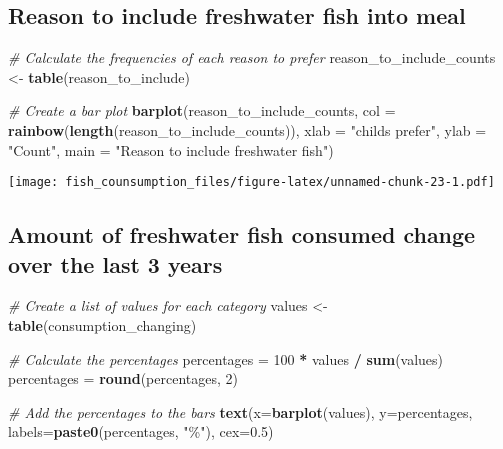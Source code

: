 \documentclass[
]{article}
\newenvironment{Shaded}{\begin{snugshade}}{\end{snugshade}}
\newcommand{\AttributeTok}[1]{\textcolor[rgb]{0.13,0.29,0.53}{#1}}
\newcommand{\CommentTok}[1]{\textcolor[rgb]{0.56,0.35,0.01}{\textit{#1}}}
\newcommand{\DecValTok}[1]{\textcolor[rgb]{0.00,0.00,0.81}{#1}}
\newcommand{\FloatTok}[1]{\textcolor[rgb]{0.00,0.00,0.81}{#1}}
\newcommand{\FunctionTok}[1]{\textcolor[rgb]{0.13,0.29,0.53}{\textbf{#1}}}
\newcommand{\NormalTok}[1]{#1}
\newcommand{\OtherTok}[1]{\textcolor[rgb]{0.56,0.35,0.01}{#1}}
\newcommand{\SpecialCharTok}[1]{\textcolor[rgb]{0.81,0.36,0.00}{\textbf{#1}}}
\newcommand{\StringTok}[1]{\textcolor[rgb]{0.31,0.60,0.02}{#1}}
\begin{document}
\hypertarget{reason-to-include-freshwater-fish-into-meal}{%
\subsection{Reason to include freshwater fish into
meal}\label{reason-to-include-freshwater-fish-into-meal}}

\begin{Shaded}
\begin{Highlighting}[]
\CommentTok{\# Calculate the frequencies of each reason to prefer}
\NormalTok{reason\_to\_include\_counts }\OtherTok{\textless{}{-}} \FunctionTok{table}\NormalTok{(reason\_to\_include)}

\CommentTok{\# Create a bar plot}
\FunctionTok{barplot}\NormalTok{(reason\_to\_include\_counts, }\AttributeTok{col =} \FunctionTok{rainbow}\NormalTok{(}\FunctionTok{length}\NormalTok{(reason\_to\_include\_counts)), }
        \AttributeTok{xlab =} \StringTok{"child\textquotesingle{}s prefer"}\NormalTok{, }\AttributeTok{ylab =} \StringTok{"Count"}\NormalTok{, }\AttributeTok{main =} \StringTok{"Reason to include freshwater fish"}\NormalTok{)}
\end{Highlighting}
\end{Shaded}

\texttt{[image: fish\_counsumption\_files/figure-latex/unnamed-chunk-23-1.pdf]}

\hypertarget{amount-of-freshwater-fish-consumed-change-over-the-last-3-years}{%
\subsection{Amount of freshwater fish consumed change over the last 3
years}\label{amount-of-freshwater-fish-consumed-change-over-the-last-3-years}}

\begin{Shaded}
\begin{Highlighting}[]
\CommentTok{\# Create a list of values for each category}
\NormalTok{values }\OtherTok{\textless{}{-}} \FunctionTok{table}\NormalTok{(consumption\_changing)}

\CommentTok{\# Calculate the percentages}
\NormalTok{percentages }\OtherTok{=} \DecValTok{100} \SpecialCharTok{*}\NormalTok{ values }\SpecialCharTok{/} \FunctionTok{sum}\NormalTok{(values)}
\NormalTok{percentages }\OtherTok{=} \FunctionTok{round}\NormalTok{(percentages, }\DecValTok{2}\NormalTok{)}

\CommentTok{\# Add the percentages to the bars}
\FunctionTok{text}\NormalTok{(}\AttributeTok{x=}\FunctionTok{barplot}\NormalTok{(values), }\AttributeTok{y=}\NormalTok{percentages, }\AttributeTok{labels=}\FunctionTok{paste0}\NormalTok{(percentages, }\StringTok{"\%"}\NormalTok{), }\AttributeTok{cex=}\FloatTok{0.5}\NormalTok{)}
\end{Highlighting}
\end{Shaded}
\end{document}
